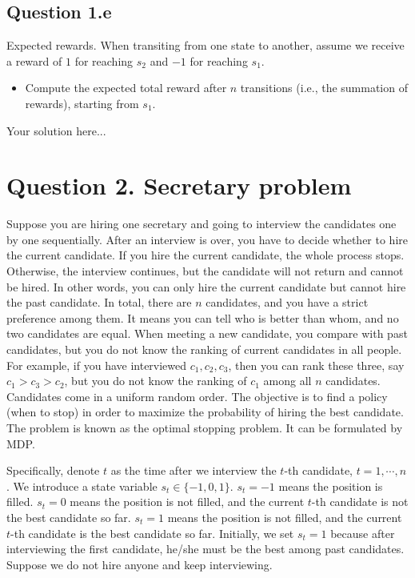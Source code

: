 \documentclass[12pt]{article}
\begin{document}
\subsection*{Question 1.e} Expected rewards. When transiting from one state to another, assume we receive a reward of $1$ for reaching $s_2$ and $-1$ for reaching $s_1$.
\begin{itemize}
    \item Compute the expected total reward after 
$n$ transitions (i.e., the summation of rewards), starting from $s_1$.
\end{itemize}

\begin{solution}
Your solution here...
\end{solution}

\section*{Question 2. Secretary problem}

Suppose you are hiring one secretary and going to interview the
candidates one by one sequentially. After an interview is over, you have to decide whether to hire
the current candidate. If you hire the current candidate, the whole process stops. Otherwise, the
interview continues, but the candidate will not return and cannot be hired. In other words, you
can only hire the current candidate but cannot hire the past candidate. In total, there are $n$ candidates,
and you have a strict preference among them. It means you can tell who is better than whom, and
no two candidates are equal. When meeting a new candidate, you compare with past candidates, but you do not know the ranking of current candidates in all people. For example, if you have
interviewed $c_1,c_2,c_3$, then you can rank these three, say $c_1>c_3>c_2$, but you do not know the ranking of $c_1$ among all $n$ candidates. Candidates come in a uniform random order. The objective is to find a policy (when to stop) in order to maximize the probability of hiring the best candidate.
The problem is known as the optimal stopping problem. It can be formulated by MDP.

Specifically, denote $t$ as the time after we interview the $t$-th candidate, $t = 1, \cdots, n$. We introduce a state variable $s_t \in \{-1, 0, 1\}$. $s_t = -1$  means the position is filled. $s_t = 0$ means the position is
    not filled, and the current $t$-th candidate is not the best candidate so far. $s_t = 1$  means the
    position is not filled, and the current $t$-th candidate is the best candidate so far.  Initially, we
    set $s_t = 1$ because after interviewing the first candidate, he/she must be the best among
    past candidates. Suppose we do not hire anyone and keep interviewing.
\end{document}

